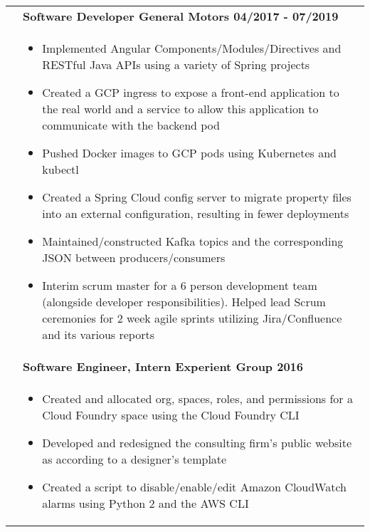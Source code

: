 \documentclass[final]{letter}
\begin{document}
\begin{center}
\begin{tabularx}{\linewidth}{>{\raggedright\bf\Large{}}p{10.75em}X}
			& \large\bf{Software Developer \hfill {General Motors} \hfill 04/2017 - 07/2019} \\
			& \begin{itemize}[noitemsep,topsep=0pt]\setlength\itemsep{2px}
				\item Implemented Angular Components/Modules/Directives and RESTful Java APIs using a variety of Spring projects  
				\item Created a GCP ingress to expose a front-end application to the real world and a service to allow this application to communicate with the backend pod
				\item Pushed Docker images to GCP pods using Kubernetes and kubectl
				\item Created a Spring Cloud config server to migrate property files into an external configuration, resulting in fewer deployments
				\item Maintained/constructed Kafka topics and the corresponding JSON between producers/consumers
				\item Interim scrum master for a 6 person development team (alongside developer responsibilities). Helped lead Scrum ceremonies for 2 week agile sprints utilizing Jira/Confluence and its various reports
			\end{itemize} \\
		
			& \large\bf{Software Engineer, Intern \hfill {Experient Group} \hfill 2016} \\
			& \begin{itemize}[noitemsep,topsep=0pt]\setlength\itemsep{2px}
				\item Created and allocated org, spaces, roles, and permissions for a Cloud Foundry space using the Cloud Foundry CLI
				\item Developed and redesigned the consulting firm's public website as according to a designer's template
				\item Created a script to disable/enable/edit Amazon CloudWatch alarms using Python 2 and the AWS CLI
			\end{itemize} \\
		\end{tabularx} \\


\end{center}
\end{document}

